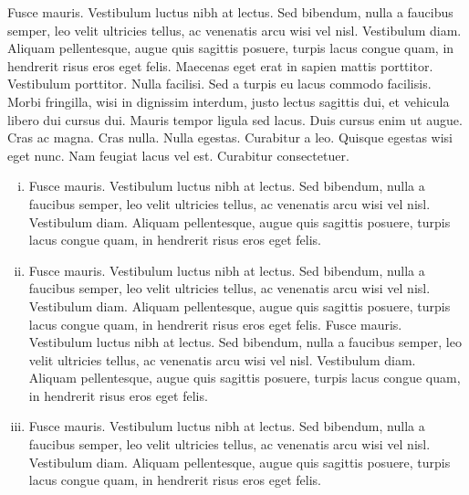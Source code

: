 Fusce mauris. Vestibulum luctus nibh at lectus. Sed bibendum, nulla a faucibus semper, leo velit
ultricies tellus, ac venenatis arcu wisi vel nisl. Vestibulum diam. Aliquam pellentesque, augue quis
sagittis posuere, turpis lacus congue quam, in hendrerit risus eros eget felis. Maecenas eget erat in
sapien mattis porttitor. Vestibulum porttitor. Nulla facilisi. Sed a turpis eu lacus commodo facilisis.
Morbi fringilla, wisi in dignissim interdum, justo lectus sagittis dui, et vehicula libero dui cursus
dui. Mauris tempor ligula sed lacus. Duis cursus enim ut augue. Cras ac magna. Cras nulla. Nulla
egestas. Curabitur a leo. Quisque egestas wisi eget nunc. Nam feugiat lacus vel est. Curabitur
consectetuer.
\begin{enumerate}[(iii)]
\item[(i)]
 Fusce mauris. Vestibulum luctus nibh at lectus. Sed bibendum, nulla a faucibus
semper, leo velit ultricies tellus, ac venenatis arcu wisi vel nisl. Vestibulum diam. Aliquam pellentesque,
augue quis sagittis posuere, turpis lacus congue quam, in hendrerit risus eros eget felis.
\item[(ii)]
Fusce mauris. Vestibulum luctus nibh at lectus. Sed bibendum, nulla a faucibus
semper, leo velit ultricies tellus, ac venenatis arcu wisi vel nisl. Vestibulum diam. Aliquam pellentesque,
augue quis sagittis posuere, turpis lacus congue quam, in hendrerit risus eros eget felis. Fusce mauris. Vestibulum luctus nibh at lectus. Sed bibendum, nulla a faucibus
semper, leo velit ultricies tellus, ac venenatis arcu wisi vel nisl. Vestibulum diam. Aliquam pellentesque,
augue quis sagittis posuere, turpis lacus congue quam, in hendrerit risus eros eget felis.
\item[(iv)]
Fusce mauris. Vestibulum luctus nibh at lectus. Sed bibendum, nulla a faucibus
semper, leo velit ultricies tellus, ac venenatis arcu wisi vel nisl. Vestibulum diam. Aliquam pellentesque,
augue quis sagittis posuere, turpis lacus congue quam, in hendrerit risus eros eget felis.
\end{enumerate}

